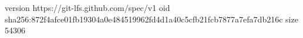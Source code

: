version https://git-lfs.github.com/spec/v1
oid sha256:872f4afce01fb19304a0e484519962fd4d1a40c5cfb21fcb7877a7efa7db216c
size 54306
